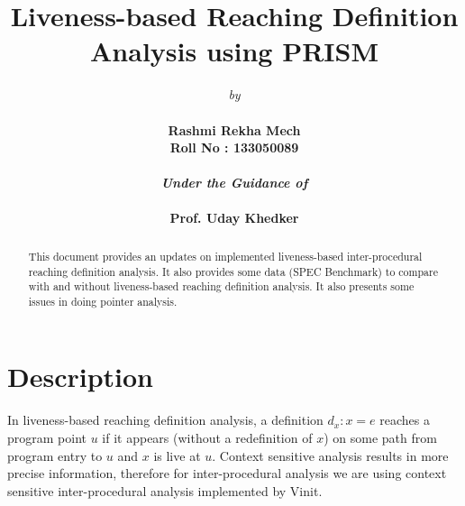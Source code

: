 \documentclass[11pt,a4paper,openright]{report}
\title{\textbf{Liveness-based Reaching Definition Analysis using PRISM}}
\author{\emph{by}\\ \\ \bf{Rashmi Rekha Mech}\\\bf{Roll No : 133050089} \\
\\ \emph{Under the Guidance of}\\ \\\textbf{Prof. Uday Khedker}\\}
\date{}
\begin{document}
\maketitle
\begin{abstract}
 This document provides an updates on implemented liveness-based inter-procedural reaching definition analysis. It also provides some data (SPEC Benchmark) to compare 
 with and without liveness-based reaching definition analysis. It also presents some issues in doing pointer analysis. 
\end{abstract}




\maketitle
\section*{Description}
In liveness-based reaching definition analysis, a definition $d_x: x=e$ reaches a program point $u$ if it appears (without a redefinition of $x$) on some path from program 
entry to $u$ and $x$ is live at $u$. Context sensitive analysis results in more precise information, therefore for inter-procedural analysis we are using context sensitive 
inter-procedural analysis implemented by Vinit. 
\end{document}
